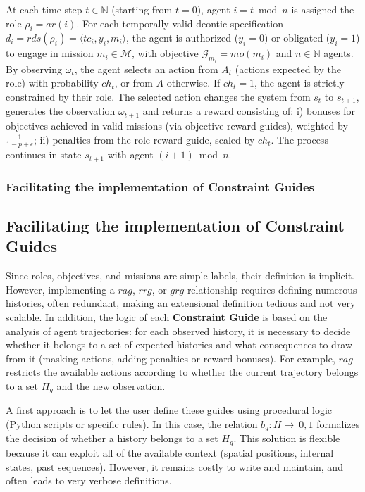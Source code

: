 At each time step $t \in \mathbb{N}$ (starting from $t=0$), agent $i = t \bmod n$ is assigned the role $\rho_i = ar(i)$. For each temporally valid deontic specification $d_i = rds(\rho_i) = \langle tc_i, y_i, m_i \rangle$, the agent is authorized ($y_i = 0$) or obligated ($y_i = 1$) to engage in mission $m_i \in \mathcal{M}$, with objective $\mathcal {G}_{m_i} = mo(m_i)$ and $n \in \mathbb{N}$ agents.
%
By observing $\omega_t$, the agent selects an action from $A_t$ (actions expected by the role) with probability $ch_t$, or from $A$ otherwise. If $ch_t = 1$, the agent is strictly constrained by their role.
%
The selected action changes the system from $s_t$ to $s_{t+1}$, generates the observation $\omega_{t+1}$ and returns a reward consisting of:
i) bonuses for objectives achieved in valid missions (via objective reward guides), weighted by $\frac{1}{1 - p + \epsilon}$;
ii) penalties from the role reward guide, scaled by $ch_t$.
%
The process continues in state $s_{t+1}$ with agent $(i + 1) \bmod n$.

\subsubsection*{Facilitating the implementation of \textbf{Constraint Guides}}
\subsection{Facilitating the implementation of \textbf{Constraint Guides}}

Since roles, objectives, and missions are simple labels, their definition is implicit. However, implementing a \(rag\), \(rrg\), or \(grg\) relationship requires defining numerous histories, often redundant, making an extensional definition tedious and not very scalable. In addition, the logic of each \textbf{Constraint Guide} is based on the analysis of agent trajectories: for each observed history, it is necessary to decide whether it belongs to a set of expected histories and what consequences to draw from it (masking actions, adding penalties or reward bonuses). For example, \(rag\) restricts the available actions according to whether the current trajectory belongs to a set \(H_g\) and the new observation.

A first approach is to let the user define these guides using procedural logic (Python scripts or specific rules). In this case, the relation \(b_g: H \to \ {0,1}\) formalizes the decision of whether a history belongs to a set \(H_g\). This solution is flexible because it can exploit all of the available context (spatial positions, internal states, past sequences). However, it remains costly to write and maintain, and often leads to very verbose definitions.

